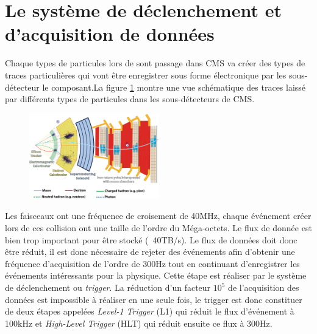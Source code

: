 \section{Le système de déclenchement et d'acquisition de données}
Chaque types de particules lors de sont passage dans CMS va créer des types de traces particulières qui vont être enregistrer sous forme électronique par les sous-détecteur le composant.La figure \ref{particules} montre une vue schématique des traces laissé par différents types de particules dans les sous-détecteurs de CMS.

	  \begin{figure}[ht!]
	\centering
	\includegraphics[width=0.50\textwidth]{CMS/particles.png}
	\label{particules}
\end{figure}

Les faisceaux ont une fréquence de croisement de 40MHz, chaque événement créer lors de ces collision ont une taille de l'ordre du Méga-octets. Le flux de donnée est bien trop important pour être stocké (~40TB/s). Le flux de données doit donc être réduit, il est donc nécessaire de rejeter des événements afin d'obtenir une fréquence d'acquisition de l'ordre de 300Hz tout en continuant d'enregistrer les événements intéressants pour la physique. Cette étape est réaliser par le système de déclenchement ou \textit{trigger}. La réduction d'un facteur $10^{5}$ de l'acquisition des données est impossible à réaliser en une seule fois, le trigger est donc constituer de deux étapes appelées \textit{Level-1 Trigger} (L1) qui réduit le flux d'événement à 100kHz et \textit{High-Level Trigger} (HLT) qui réduit ensuite ce flux à 300Hz.

